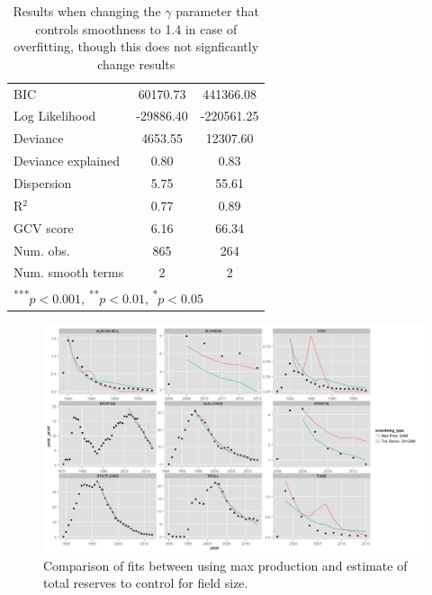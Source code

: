 \documentclass[12pt]{article}
\begin{document}
\begin{table}
\begin{center}
\begin{tabular}{l c c }
BIC                                  & 60170.73      & 441366.08     \\
Log Likelihood                       & -29886.40     & -220561.25    \\
Deviance                             & 4653.55       & 12307.60      \\
Deviance explained                   & 0.80          & 0.83          \\
Dispersion                           & 5.75          & 55.61         \\
R$^2$                                & 0.77          & 0.89          \\
GCV score                            & 6.16          & 66.34         \\
Num. obs.                            & 865           & 264           \\
Num. smooth terms                    & 2             & 2             \\
\hline
\multicolumn{3}{l}{\scriptsize{\textsuperscript{***}$p<0.001$, 
  \textsuperscript{**}$p<0.01$, 
  \textsuperscript{*}$p<0.05$}}
\end{tabular}
\caption{Results when changing the $\gamma$ parameter that controls smoothness to 1.4 in case of overfitting, though this does not signficantly change results}
\label{table:gamma_check}
\end{center}
\end{table}

\begin{figure}
	\includegraphics[width=.8\textwidth]{figures/Max_prod_vs_TRO_print.png}
	\caption{Comparison of fits between using max production and estimate of total reserves to control for field size.}
	\label{chart:Max_prod_vs_TRO_print}
\end{figure}
\end{document}
